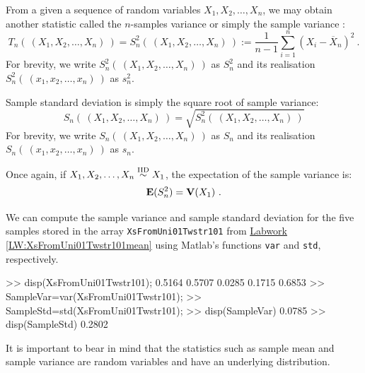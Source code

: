 \begin{definition}
From a given a sequence of random variables $X_1,X_2,\ldots,X_n$, we may obtain another statistic called the $n$-samples variance or simply the sample variance :
\begin{equation}\label{E:SampleVarianceRV}
T_n( \ (X_1,X_2,\ldots,X_n) \ ) = S^2_n( \ (X_1,X_2,\ldots,X_n) \ )  := \frac{1}{n-1} \sum_{i=1}^n {(X_i - \overline{X}_n)^2}  \ .
\end{equation}
For brevity, we write $S^2_n( \ (X_1,X_2,\ldots,X_n) \ )$ as $S^2_n$ and its  realisation $S^2_n( \ (x_1,x_2,\ldots,x_n) \ )$ as $s^2_n$.

Sample standard deviation is simply the square root of sample variance:
\begin{equation}\label{E:SampleStdDevRV}
S_n( \ (X_1,X_2,\ldots,X_n) \ ) = \sqrt{S^2_n( \ (X_1,X_2,\ldots,X_n) \ )}
\end{equation}
For brevity, we write $S_n( \ (X_1,X_2,\ldots,X_n) \ )$ as $S_n$ and its  realisation $S_n( \ (x_1,x_2,\ldots,x_n) \ )$ as $s_n$.
\end{definition}
Once again, if $X_1,X_2,\ldots,X_n \overset{{\rm IID}}{\sim} X_1$, the expectation of the sample variance is:
\[
\mathbf{E}(S^2_n) = \mathbf{V}(X_1) \ .
\]
\begin{labwork}\label{LW:XsFromUni01Twstr101varstd}
We can compute the sample variance and sample standard deviation for the five samples stored in the array {\tt XsFromUni01Twstr101} from \hyperref[LW:XsFromUni01Twstr101mean]{Labwork \ref*{LW:XsFromUni01Twstr101mean}} using {\sc Matlab}'s functions {\tt var} and {\tt std}, respectively.
\begin{VrbM}
>> disp(XsFromUni01Twstr101); %
    0.5164    0.5707    0.0285    0.1715    0.6853
>> SampleVar=var(XsFromUni01Twstr101);%
>> SampleStd=std(XsFromUni01Twstr101);%
>> disp(SampleVar) %
    0.0785
>> disp(SampleStd) %
    0.2802
\end{VrbM}
\end{labwork}
It is important to bear in mind that the statistics such as sample mean and sample variance are random variables and have an underlying distribution.

